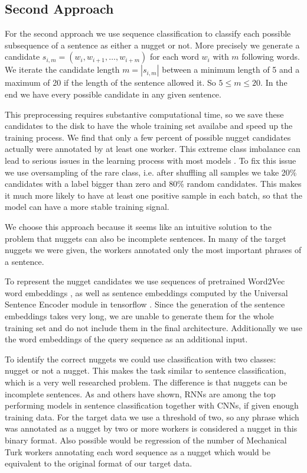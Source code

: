 \documentclass{article}
\begin{document}
 \subsection{Second Approach}
For the second approach we use sequence classification to classify each possible subsequence of a sentence as either a nugget or not. More precisely we generate a candidate $s_{i,m}=(w_i, w_{i+1}, \dots , w_{i+m})$ for each word $w_i$ with $m$ following words. We iterate the candidate length $m=|s_{i,m}|$ between a minimum length of 5 and a maximum of 20 if the length of the sentence allowed it. So $5 \leq m \leq 20$. In the end we have every possible candidate in any given sentence.

This preprocessing requires substantive computational time, so we save these candidates to the disk to have the whole training set availabe and speed up the training process. We find that only a few percent of possible nugget candidates actually were annotated by at least one worker. This extreme class imbalance can lead to serious issues in the learning process with most models \cite{japkowicz2002class}. To fix this issue we use oversampling of the rare class, i.e. after shuffling all samples we take 20\% candidates with a label bigger than zero and 80\% random candidates. This makes it much more likely to have at least one positive sample in each batch, so that the model can have a more stable training signal.

We choose this approach because it seems like an intuitive solution to the problem that nuggets can also be incomplete sentences. In many of the target nuggets we were given, the workers annotated only the most important phrases of a sentence.

To represent the nugget candidates we use sequences of pretrained Word2Vec word embeddings \cite{w2v}, as well as sentence embeddings computed by the Universal Sentence Encoder module in tensorflow \cite{universal2018}. Since the generation of the sentence embeddings takes very long, we are unable to generate them for the whole training set and do not include them in the final architecture. Additionally we use the word embeddings of the query sequence as an additional input.

To identify the correct nuggets we could use classification with two classes: nugget or not a nugget. This makes the task similar to sentence classification, which is a very well researched problem. The difference is that nuggets can be incomplete sentences. As \citep{zhou2015c} and others have shown, RNNs are among the top performing models in sentence classification together with CNNs, if given enough training data. For the target data we use a threshold of two, so any phrase which was annotated as a nugget by two or more workers is considered a nugget in this binary format. Also possible would be regression of the number of Mechanical Turk workers annotating each word sequence as a nugget which would be equivalent to the original format of our target data.
\end{document}
